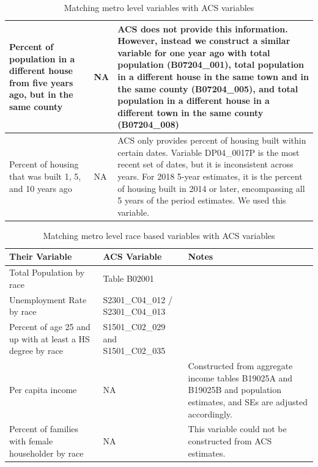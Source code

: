 \documentclass[12pt]{article}
\begin{document}
\begin{table}[ht]
{\begin{tabular}{|m{9em}|m{3cm}|m{9cm}|}
    Percent of population in a different house from five years ago, but in the same county & NA & ACS does not provide this information. However, instead we construct a similar variable for one year ago with total population (B07204\_001), total population in a different house in the same town and in the same county (B07204\_005), and total population in a different house in a different town in the same county (B07204\_008)\\\hline
    Percent of housing that was built 1, 5, and 10 years ago & NA & ACS only provides percent of housing built within certain dates. Variable DP04\_0017P is the most recent set of dates, but it is inconsistent across years. For 2018 5-year estimates, it is the percent of housing built in 2014 or later, encompassing all 5 years of the period estimates. We used this variable.\\\hline
  \end{tabular}
}
\caption{Matching metro level variables with ACS variables}
\label{tab:metro.acs}
\end{table}

\begin{table}[ht]
  \centering
  \scriptsize{
  \begin{tabular}{|m{9em}|m{3cm}|m{9cm}|}
    \hline
    Their Variable & ACS Variable & Notes \\
    \hline
    Total Population by race & Table B02001 & \\\hline
    Unemployment Rate by race & S2301\_C04\_012 / S2301\_C04\_013 & \\\hline
    Percent of age 25 and up with at least a HS degree by race & S1501\_C02\_029 and S1501\_C02\_035 & \\\hline
    Per capita income & NA & Constructed from aggregate income tables B19025A and B19025B and population estimates, and SEs are adjusted accordingly.\\\hline
    Percent of families with female householder by race & NA & This variable could not be constructed from ACS estimates. \\\hline
    \end{tabular}
    }
    \caption{Matching metro level race based variables with ACS variables}
    \label{tab:race.acs}
\end{table}

\clearpage
\end{document}

